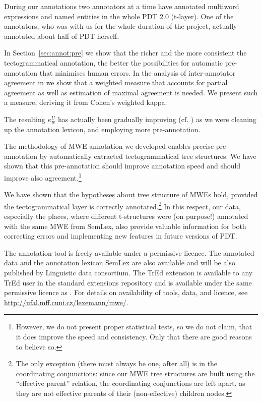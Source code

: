 During our annotations two annotators at a time have annotated multiword expressions and named entities in the whole PDT 2.0 (t-layer). One of the annotators, who was with us for the whole duration of the project, actually annotated about half of PDT herself.

In Section~\ref{sec:annot:pre} we show that the richer and the more consistent the tectogrammatical annotation, the better the possibilities for automatic pre-annotation that minimises human errors. In the analysis of inter-annotator agreement in  we show that a weighted measure that accounts for partial agreement as well as estimation of maximal agreement is needed. We present such a measure, deriving it from Cohen's weighted kappa.

The resulting $\kappa_w^U$ has actually been gradually improving (cf. \citealp{biblio:BeStAnnotationMultiword2008}) as we were cleaning up the annotation lexicon, and employing more pre-annotation.

The methodology of MWE annotation we developed enables precise pre-annotation by automatically extracted tectogrammatical tree structures. We have shown that this pre-annotation should improve annotation speed and should improve also agreement.\footnote{However, we do not present proper statistical tests, so we do not claim, that it does improve the speed and consistency. Only that there are good reasons to believe so.} 

We have shown that the hypotheses about tree structure of MWEs hold, provided the tectogrammatical layer is correctly annotated.\footnote{The only exception (there must always be one, after all) is in the coordinating conjunctions: since our MWE tree structures are built using the ``effective parent'' relation, the coordinating conjunctions are left apart, as they are not effective parents of their (non-effective) children nodes.} In this respect, our data, especially the places, where different t-structures were (on purpose!) annotated with the same MWE from SemLex, also provide valuable information for both correcting errors and implementing new features in future versions of PDT. 

The annotation tool  is freely available under a permissive licence. The annotated data and the annotation lexicon SemLex are also available and will be also published by Linguistic data consortium. The TrEd extension is available to any TrEd user in the standard extensions repository and is available under the same permissive licence as . For details on availability of tools, data, and licence, see \url{http://ufal.mff.cuni.cz/lexemann/mwe/}.

